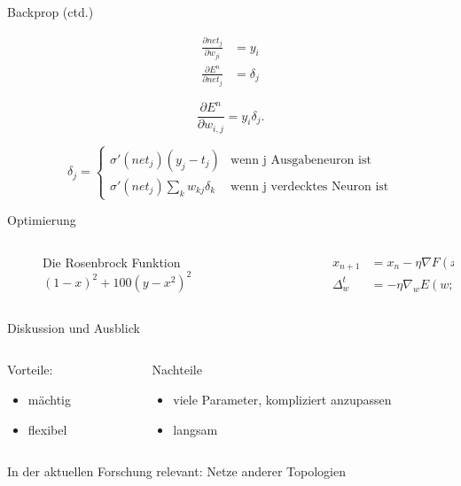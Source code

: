 \documentclass[10pt, compress, xetex]{beamer}
\begin{document}
\begin{frame}{Backprop (ctd.)}


\begin{align}
  \frac{\partial net_j }{\partial w_{ji}} & =  y_i
  \\
  \frac{\partial E^n}{\partial net_j} & =  \delta_j
\end{align}

\begin{equation}
\label{eq:evaluate}
  \frac{\partial E^n}{\partial w_{i,j}} = y_i  \delta_j.
\end{equation}

\begin{equation}
\label{eq:backpropagation}
\delta_j =  \begin{cases}
               \sigma ' (net_j) (y_j - t_j)           & \text{wenn j Ausgabeneuron ist}\\
               \sigma ' (net_j) \sum_k w_{kj} \delta_k     & \text{wenn j verdecktes Neuron ist}
           \end{cases} 
\end{equation} 
\end{frame}
\begin{frame}{Optimierung}


\begin{columns}[c]
  \begin{column}[c]{.3\textwidth}
  \begin{figure}[ht!]
  \centering
  \caption{Die Rosenbrock Funktion $(1-x)^2 + 100(y - x^2)^2$}

\end{figure}
  \end{column}  
  \begin{column}[c]{.7\textwidth}
    \begin{align}
    x_{n+1} &=x_n- \eta  \nabla F(x_n) \\
    \Delta_w^t &= - \eta  \nabla_w E(w;t)
    \end{align}
    \end{column}
\end{columns} 
\end{frame}

\begin{frame}{Diskussion und Ausblick}
\begin{columns}[T]
  \begin{column}[T]{.5\textwidth}
        Vorteile:
        \begin{itemize}
          \item mächtig
          \item flexibel
        \end{itemize}
  \end{column}  
  \begin{column}[T]{.5\textwidth}
        Nachteile
        \begin{itemize}
          \item viele Parameter, kompliziert anzupassen
          \item langsam
        \end{itemize}
    \end{column}
\end{columns} 
In der \alert{aktuellen} Forschung relevant: Netze anderer Topologien 
\end{frame}
\end{document}
